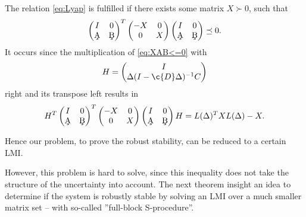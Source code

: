 The relation \eqref{eq:Lyap} is fulfilled if there exists some matrix $X \succ  0$, such that 
\begin{align}
\label{eq:XAB<=0}
\begin{pmatrix}
I & 0 \\ \c{A} &  \c{B}
\end{pmatrix}^T
\begin{pmatrix}
-X & 0 \\ 0 & X
\end{pmatrix}
\begin{pmatrix}
I & 0 \\ \c{A} &  \c{B}
\end{pmatrix} \preceq 0.
\end{align}
It occurs since the  multiplication of \eqref{eq:XAB<=0} with
\begin{align}
\label{eq:H}
H = \begin{pmatrix}
I \\ \Delta ( I - \c{D} \Delta)^{-1}C
\end{pmatrix}
\end{align}
right and its transpose left results in 
\begin{align}
H^T
\begin{pmatrix}
I & 0 \\ \c{A} &  \c{B}
\end{pmatrix}^T
\begin{pmatrix}
-X & 0 \\ 0 & X
\end{pmatrix} 
\begin{pmatrix}
I & 0 \\ \c{A} &  \c{B}
\end{pmatrix} H 
= L(\Delta)^T X L(\Delta) - X.
\end{align}

Hence our problem, to prove the robust stability, can be reduced to a certain LMI.

However, this problem is hard to solve, since this inequality does not take the structure of the uncertainty into account. The next theorem insight an idea to determine if the system is robustly stable by solving an LMI over a much smaller matrix set -- with so-called ''full-block S-procedure''.



